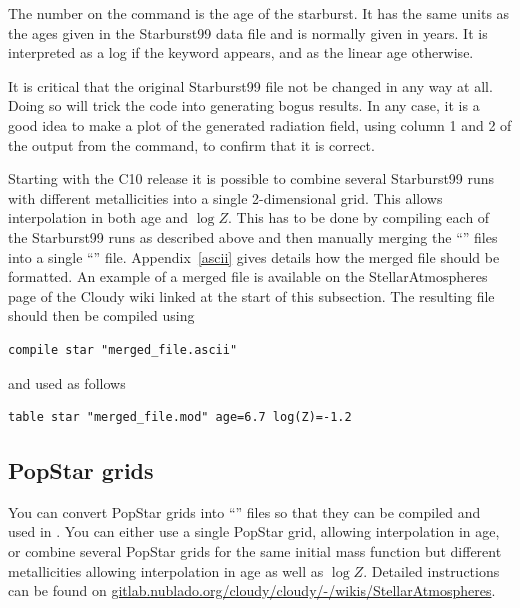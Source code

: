 The number on the  command is the
age of the starburst.  It has the same units as the ages given in the
Starburst99 data file and is normally given in years.
It is interpreted as a log if the keyword  appears,
and as the linear age otherwise.

It is critical that the original Starburst99 file not be
changed in any way at all.
Doing so will trick the code into generating bogus results.
In any case, it is a good idea to make a plot of the generated
radiation field,
using column 1 and 2 of the output from
the  command, to confirm that it is correct.

Starting with the C10 release it is possible to combine several
Starburst99 runs with different metallicities into a single 2-dimensional
grid. This allows interpolation in both age and $\log Z$. This has
to be done by compiling each of the Starburst99 runs as described above
and then manually merging the ``'' files into a single
``'' file. Appendix~\ref{ascii} gives details how the merged
file should be formatted. An example of a merged file is available on the
StellarAtmospheres page of the Cloudy wiki linked at the start of this subsection.
The resulting file should then be compiled using
\begin{verbatim}
compile star "merged_file.ascii"
\end{verbatim}
and used as follows
\begin{verbatim}
table star "merged_file.mod" age=6.7 log(Z)=-1.2
\end{verbatim}

\subsection{PopStar grids}

You can convert PopStar grids into ``'' files so that they
can be compiled and used in \Cloudy. You can either use a single PopStar grid,
allowing interpolation in age, or combine several PopStar grids for the same
initial mass function but different metallicities allowing interpolation in
age as well as $\log Z$. Detailed instructions can be found on
\href{https://gitlab.nublado.org/cloudy/cloudy/-/wikis/StellarAtmospheres}{gitlab.nublado.org/cloudy/cloudy/-/wikis/StellarAtmospheres}.
